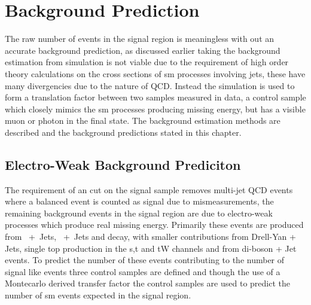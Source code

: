 \chapter{Background Prediction} %

The raw number of events in the signal region is meaningless with out 
an accurate background prediction, as discussed earlier taking the background 
estimation from simulation is not viable due to the requirement of high order 
theory calculations on the cross sections of \ac{sm} processes involving 
jets, these have many divergencies due to the nature of QCD. Instead the 
simulation is used to form a translation factor between two samples measured in 
data, a control sample which closely mimics the \ac{sm} processes 
producing missing energy, but has a visible muon or photon in the final state. 
The background estimation methods are described and the background predictions 
stated in this chapter.

\section{Electro-Weak Background Prediciton} %
\label{sec:electro_weak_background_prediciton}

The requirement of an \alt cut on the signal sample removes multi-jet QCD 
events where a balanced event is counted as signal due to mismeasurements, 
the remaining background events in the signal region are due to electro-weak 
processes which produce real missing energy. Primarily these events are 
produced from \HepProcess{\PZ\to\Pnu\APnu}~+~Jets, 
\HepProcess{\PW\to\Pl\APnu}~+~Jets and \HepProcess{\Ptop\APtop} decay, with 
smaller contributions from Drell-Yan + Jets, single top production in the s,t 
and tW channels and from di-boson + Jet events. To predict the number of these 
events contributing to the number of signal like events three control samples 
are defined and though the use of a Montecarlo derived transfer factor the 
control samples are used to predict the number of \ac{sm} events expected in 
the signal region.


